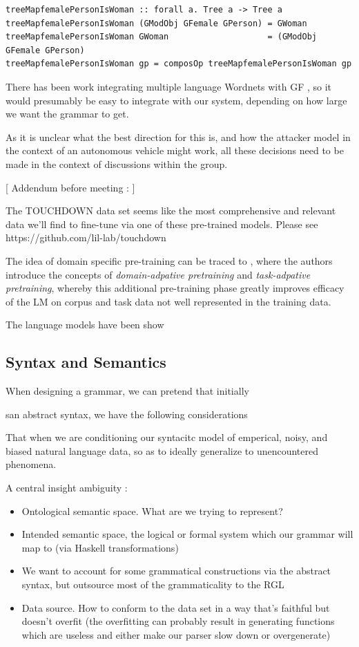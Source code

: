 \documentclass[a4paper, 11pt]{article}
\begin{document}
\begin{verbatim}
treeMapfemalePersonIsWoman :: forall a. Tree a -> Tree a
treeMapfemalePersonIsWoman (GModObj GFemale GPerson) = GWoman
treeMapfemalePersonIsWoman GWoman                    = (GModObj GFemale GPerson)
treeMapfemalePersonIsWoman gp = composOp treeMapfemalePersonIsWoman gp
\end{verbatim}

There has been work integrating multiple language Wordnets with GF
\cite{virk2014developing}, so it would presumably be easy to integrate with our
system, depending on how large we want the grammar to get.


As it is unclear what the best direction for this is, and how the attacker model
in the context of an autonomous vehicle might work, all these decisions need to
be made in the context of discussions within the group.

[ Addendum before meeting : ]

The TOUCHDOWN data set \cite{chen2019touchdown} seems like the most
comprehensive and relevant data we'll find to fine-tune via one of these
pre-trained models. Please see https://github.com/lil-lab/touchdown


The idea of domain specific pre-training can be traced to
\cite{gururangan-etal-2020-dont}, where the authors introduce the concepts of
\emph{domain-adpative pretraining} and \emph{task-adpative pretraining}, whereby
this additional pre-training phase greatly improves efficacy of the LM on
corpus and task data not well represented in the training data.

The language models have been show \cite{bioBert}


\subsection{Syntax and Semantics}

When designing a grammar, we can pretend that initially

san abstract syntax, we have the following considerations

That when we are conditioning our syntacitc model of emperical, noisy, and
biased natural language data, so as to ideally generalize to unencountered
phenomena.

A central insight ambiguity : 


\begin{itemize}
\item Ontological semantic space. What are we trying to represent?
\item Intended semantic space, the logical or formal system which our grammar
  will map to (via Haskell transformations)
\item  We want to account for some grammatical constructions via the abstract syntax, but
  outsource most of the grammaticality to the RGL
\item Data source. How to conform to the data set in a way that's faithful but
  doesn't overfit (the overfitting can probably result in generating functions
  which are useless and either make our parser slow down or overgenerate)
\end{itemize}
\end{document}
